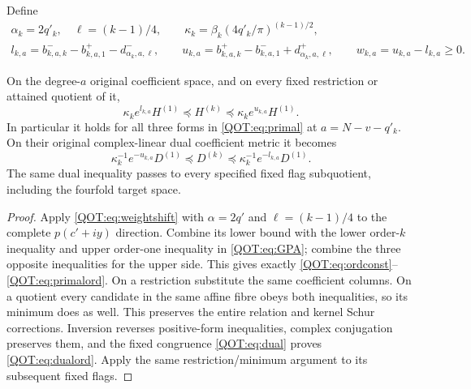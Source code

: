 \documentclass[11pt,a4paper]{article}
\begin{document}
Define
\begin{equation}
\begin{gathered}
 \alpha_k=2q'_k,\quad \ell=(k-1)/4,\qquad
 \kappa_k=\beta_k(4q'_k/\pi)^{(k-1)/2},\\
 l_{k,a}=b^-_{k,a,k}-b^+_{k,a,1}-d^-_{\alpha_k,a,\ell},\qquad
 u_{k,a}=b^+_{k,a,k}-b^-_{k,a,1}+d^+_{\alpha_k,a,\ell},\qquad
 w_{k,a}=u_{k,a}-l_{k,a}\ge0.
\end{gathered}\label{QOT:eq:ordconst}
\tag{QOT14}
\end{equation}
\begin{QOTtheorem}\label{QOT:thm:full}
On the degree-$a$ original coefficient space, and on every fixed restriction or attained quotient of it,
\begin{equation}
 \kappa_k e^{l_{k,a}}H^{(1)}\preceq H^{(k)}
                 \preceq\kappa_k e^{u_{k,a}}H^{(1)}.
 \label{QOT:eq:primalord}
\tag{QOT15}
\end{equation}
In particular it holds for all three forms in \eqref{QOT:eq:primal} at $a=N-v-q'_k$. On their original complex-linear dual coefficient metric it becomes
\begin{equation}
 \kappa_k^{-1}e^{-u_{k,a}}D^{(1)}\preceq D^{(k)}
                 \preceq\kappa_k^{-1}e^{-l_{k,a}}D^{(1)}.
 \label{QOT:eq:dualord}
\tag{QOT16}
\end{equation}
The same dual inequality passes to every specified fixed flag subquotient, including the fourfold target space.
\end{QOTtheorem}
\begin{proof}
Apply \eqref{QOT:eq:weightshift} with $\alpha=2q'$ and $\ell=(k-1)/4$ to the complete $p(c'+iy)$ direction. Combine its lower bound with the lower order-$k$ inequality and upper order-one inequality in \eqref{QOT:eq:GPA}; combine the three opposite inequalities for the upper side. This gives exactly \eqref{QOT:eq:ordconst}--\eqref{QOT:eq:primalord}. On a restriction substitute the same coefficient columns. On a quotient every candidate in the same affine fibre obeys both inequalities, so its minimum does as well. This preserves the entire relation and kernel Schur corrections. Inversion reverses positive-form inequalities, complex conjugation preserves them, and the fixed congruence \eqref{QOT:eq:dual} proves \eqref{QOT:eq:dualord}. Apply the same restriction/minimum argument to its subsequent fixed flags.
\end{proof}
\end{document}
